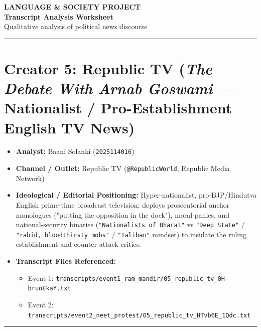 \documentclass[10pt,a4paper]{article}
\begin{document}
\begin{center}
    {\large\bfseries LANGUAGE \& SOCIETY PROJECT}\\[3pt]
    {\LARGE\bfseries Transcript Analysis Worksheet}\\[3pt]
    {\normalsize Qualitative analysis of political news discourse}
\end{center}
\vspace{2pt}
\noindent\rule{\textwidth}{0.4pt}
\vspace{4pt}


\section*{Creator 5: Republic TV (\textit{The Debate With Arnab Goswami} --- Nationalist / Pro-Establishment English TV News)}
\begin{itemize}[leftmargin=1.5em, itemsep=3pt, topsep=4pt]
  \item \textbf{Analyst:} Baani Solanki (\texttt{2025114016})
  \item \textbf{Channel / Outlet:} Republic TV (\texttt{@RepublicWorld}, Republic Media Network)
  \item \textbf{Ideological / Editorial Positioning:} Hyper-nationalist, pro-BJP/Hindutva English prime-time broadcast television; deploys prosecutorial anchor monologues ("putting the opposition in the dock"), moral panics, and national-security binaries (\texttt{"Nationalists of Bharat"} vs \texttt{"Deep State"} / \texttt{"rabid, bloodthirsty mobs"} / \texttt{"Taliban"} mindset) to insulate the ruling establishment and counter-attack critics.
  \item \textbf{Transcript Files Referenced:}
  \begin{itemize}[leftmargin=1.4em, itemsep=2pt, topsep=2pt]
    \item Event 1: \texttt{transcripts/event1\_ram\_mandir/05\_republic\_tv\_0H-bruoEkaY.txt}
    \item Event 2: \texttt{transcripts/event2\_neet\_protest/05\_republic\_tv\_HTvb6E\_1Qdc.txt}
  \end{itemize}
\end{itemize}
\vspace{4pt}\noindent\rule{\textwidth}{0.4pt}\vspace{4pt}
\end{document}
